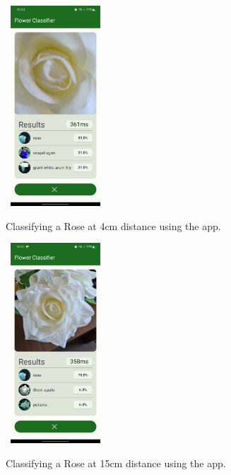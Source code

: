 \documentclass[12pt,a4paper]{report}
\begin{document}
\begin{figure}[h]\
    \includegraphics[width=0.3\textwidth]{rose_4cm.jpg}
    \caption{Classifying a Rose at 4cm distance using the app.}
    \label{fig:rose_4}
\end{figure}

\begin{figure}[h]\
    \includegraphics[width=0.3\textwidth]{rose_15cm.jpg}
    \caption{Classifying a Rose at 15cm distance using the app.}
    \label{fig:rose_15}
\end{figure}
\end{document}
